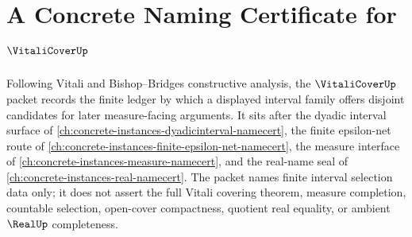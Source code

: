 \chapter{A Concrete Naming Certificate for $\VitaliCoverUp$}
\label{ch:concrete-instances-vitali-cover-namecert}

Following Vitali and Bishop--Bridges constructive analysis, the $\VitaliCoverUp$ packet records the finite ledger by which a displayed interval family offers disjoint candidates for later measure-facing arguments. It sits after the dyadic interval surface of \autoref{ch:concrete-instances-dyadicinterval-namecert}, the finite epsilon-net route of \autoref{ch:concrete-instances-finite-epsilon-net-namecert}, the measure interface of \autoref{ch:concrete-instances-measure-namecert}, and the real-name seal of \autoref{ch:concrete-instances-real-namecert}. The packet names finite interval selection data only; it does not assert the full Vitali covering theorem, measure completion, countable selection, open-cover compactness, quotient real equality, or ambient $\RealUp$ completeness.

